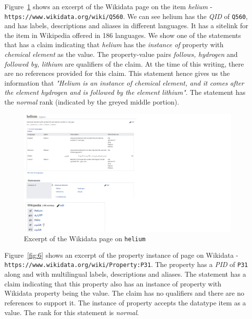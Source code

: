 Figure~\ref{fig:5} shows an excerpt of the Wikidata page on the item \textit{helium} - \texttt{https://www.wikidata.org/wiki/Q560}. We can see helium has the \textit{QID} of \texttt{Q560}, and has labels, descriptions and aliases in different languages. It has a sitelink for the item in Wikipedia offered in 186 languages. We show one of the statements that has a claim indicating that \textit{helium} has the \textit{instance of} property with \textit{chemical element} as the value. The property-value pairs \textit{follows, hydrogen} and \textit{followed by, lithium} are qualifiers of the claim. At the time of this writing, there are no references provided for this claim. This statement hence gives us the information that \textit{"Helium is an instance of chemical element, and it comes after the element hydrogen and is followed by the element lithium"}. The statement has  the \textit{normal} rank (indicated by the greyed middle portion). 

\begin{figure}[h]
  \centering
  \includegraphics[width=0.75 \linewidth]{images/helium.pdf}
  \caption{Excerpt of the Wikidata page on \texttt{helium}}
  \label{fig:5}
\end{figure}

Figure~\ref{fig:6} shows an excerpt of the property instance of page on Wikidata - \texttt{https://www.wikidata.org/wiki/Property:P31}. The property has a \textit{PID} of \texttt{P31} along and with multilingual labels, descriptions and aliases. The statement has a claim indicating that this property also has an instance of property with Wikidata property being the value. The claim has no qualifiers and there are no references to support it. The instance of property accepts the datatype item as a value. The rank for this statement is \textit{normal}.


